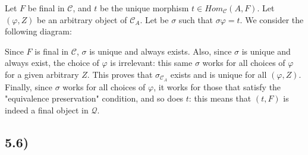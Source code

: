 \documentclass[12pt, letterpaper, twoside]{report}
\begin{document}
Let $F$ be final in $\mathcal{C}$, and $t$ be the unique morphism $t \in Hom_{\mathcal{C}} (A, F)$. Let $(\varphi, Z)$ be an arbitrary object of $\mathcal{C}_A$. Let be $\sigma$ such that $\sigma \varphi = t$. We consider the following diagram:


Since $F$ is final in $\mathcal{C}$, $\sigma$ is unique and always exists. Also, since $\sigma$ is unique and always exist, the choice of $\varphi$ is irrelevant: this same $\sigma$ works for all choices of $\varphi$ for a given arbitrary $Z$. This proves that $\sigma_{\mathcal{C}_A}$ exists and is unique for all $(\varphi, Z)$. Finally, since $\sigma$ works for all choices of $\varphi$, it works for those that satisfy the "equivalence preservation" condition, and so does $t$: this means that $(t, F)$ is indeed a final object in $\mathcal{Q}$.






\subsection*{5.6)}
\end{document}
